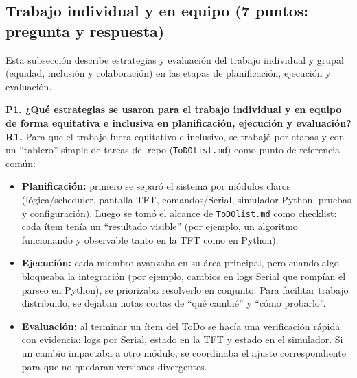 \documentclass[journal]{IEEEtran}
\begin{document}
\subsection{Trabajo individual y en equipo (7 puntos: pregunta y respuesta)}
Esta subsección describe estrategias y evaluación del trabajo individual y grupal (equidad, inclusión y colaboración) en las etapas de planificación, ejecución y evaluación.

\textbf{P1. ¿Qué estrategias se usaron para el trabajo individual y en equipo de forma equitativa e inclusiva en planificación, ejecución y evaluación?}\\
\textbf{R1.} Para que el trabajo fuera equitativo e inclusivo, se trabajó por etapas y con un “tablero” simple de tareas del repo (\texttt{ToDOlist.md}) como punto de referencia común:
\begin{itemize}
	\item \textbf{Planificación:} primero se separó el sistema por módulos claros (lógica/scheduler, pantalla TFT, comandos/Serial, simulador Python, pruebas y configuración). Luego se tomó el alcance de \texttt{ToDOlist.md} como checklist: cada ítem tenía un “resultado visible” (por ejemplo, un algoritmo funcionando y observable tanto en la TFT como en Python).
	\item \textbf{Ejecución:} cada miembro avanzaba en su área principal, pero cuando algo bloqueaba la integración (por ejemplo, cambios en logs Serial que rompían el parseo en Python), se priorizaba resolverlo en conjunto. Para facilitar trabajo distribuido, se dejaban notas cortas de “qué cambié” y “cómo probarlo”.
	\item \textbf{Evaluación:} al terminar un ítem del ToDo se hacía una verificación rápida con evidencia: logs por Serial, estado en la TFT y estado en el simulador. Si un cambio impactaba a otro módulo, se coordinaba el ajuste correspondiente para que no quedaran versiones divergentes.
\end{itemize}
\end{document}

